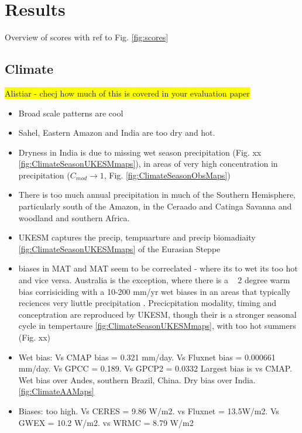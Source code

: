 \documentclass[bg, manuscript]{copernicus}
\newcommand{\hilight}[1]{\colorbox{yellow}{#1}}
\begin{document}
\section{Results}
Overview of scores with ref to Fig. \ref{fig:scores}

\subsection{Climate}
\hilight{Alistiar - checj how much of this is covered in your evaluation paper}
\begin{itemize}
    \item Broad scale patterns are cool
    \item Sahel, Eastern Amazon and India are too dry and hot.
    \item Dryness in India is due to missing wet season precipitation (Fig. xx \ref{fig:ClimateSeasonUKESMmaps}), in areas of very high concentration in precipitation ($C_{mod} \rightarrow 1$, Fig. \ref{fig:ClimateSeasonObsMaps}) 
    \item There is too much annual precipitation in much of the Southern Hemisphere, particularly south of the Amazon, in the Ceraado and Catinga Savanna and woodland and southern Africa.
    \item UKESM captures the precip, tempuarture \label{fig:ClimateAAMaps} and precip biomadiaity \ref{fig:ClimateSeasonUKESMmaps} of the Eurasian Steppe
    \item biases in MAT and MAT seem to be correclated - where its to wet its too hot and vice versa. Australia is the exception, where there is a ~ 2 degree warm bias corrisiciding with a 10-200 mm/yr wet biases in an areas that typically reciences very liuttle precipitation \label{fig:ClimateAAMaps}. Precicpitation modality, timing and conceptration are reproduced by UKESM, though their is a stronger seasonal cycle in tempertaure \ref{fig:ClimateSeasonUKESMmaps}, with too hot summers (Fig. xx)
\end{itemize}

\begin{itemize}
    \item{Wet bias: Vs CMAP bias = 0.321 mm/day. Vs Fluxnet bias = 0.000661 mm/day. Vs GPCC = 0.189. Vs GPCP2 = 0.0332
Largest bias is vs CMAP. Wet bias over Andes, southern Brazil, China. Dry bias over India. \ref{fig:ClimateAAMaps}}
    \item Biases: too high. Vs CERES = 9.86 W/m2. vs Fluxnet = 13.5W/m2. Vs GWEX = 10.2 W/m2. vs WRMC = 8.79 W/m2
\end{itemize}
\end{document}
